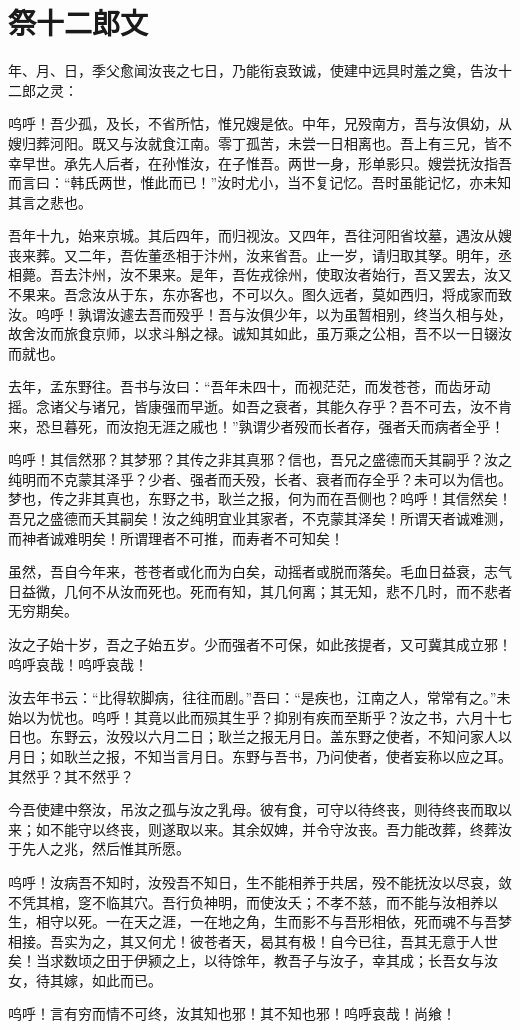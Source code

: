 \section{ 祭十二郎文}

年、月、日，季父愈闻汝丧之七日，乃能衔哀致诚，使建中远具时羞之奠，告汝十二郎之灵：

呜呼！吾少孤，及长，不省所怙，惟兄嫂是依。中年，兄殁南方，吾与汝俱幼，从嫂归葬河阳。既又与汝就食江南。零丁孤苦，未尝一日相离也。吾上有三兄，皆不幸早世。承先人后者，在孙惟汝，在子惟吾。两世一身，形单影只。嫂尝抚汝指吾而言曰：“韩氏两世，惟此而已！”汝时尤小，当不复记忆。吾时虽能记忆，亦未知其言之悲也。

吾年十九，始来京城。其后四年，而归视汝。又四年，吾往河阳省坟墓，遇汝从嫂丧来葬。又二年，吾佐董丞相于汴州，汝来省吾。止一岁，请归取其孥。明年，丞相薨。吾去汴州，汝不果来。是年，吾佐戎徐州，使取汝者始行，吾又罢去，汝又不果来。吾念汝从于东，东亦客也，不可以久。图久远者，莫如西归，将成家而致汝。呜呼！孰谓汝遽去吾而殁乎！吾与汝俱少年，以为虽暂相别，终当久相与处，故舍汝而旅食京师，以求斗斛之禄。诚知其如此，虽万乘之公相，吾不以一日辍汝而就也。

去年，孟东野往。吾书与汝曰：“吾年未四十，而视茫茫，而发苍苍，而齿牙动摇。念诸父与诸兄，皆康强而早逝。如吾之衰者，其能久存乎？吾不可去，汝不肯来，恐旦暮死，而汝抱无涯之戚也！”孰谓少者殁而长者存，强者夭而病者全乎！

呜呼！其信然邪？其梦邪？其传之非其真邪？信也，吾兄之盛德而夭其嗣乎？汝之纯明而不克蒙其泽乎？少者、强者而夭殁，长者、衰者而存全乎？未可以为信也。梦也，传之非其真也，东野之书，耿兰之报，何为而在吾侧也？呜呼！其信然矣！吾兄之盛德而夭其嗣矣！汝之纯明宜业其家者，不克蒙其泽矣！所谓天者诚难测，而神者诚难明矣！所谓理者不可推，而寿者不可知矣！

虽然，吾自今年来，苍苍者或化而为白矣，动摇者或脱而落矣。毛血日益衰，志气日益微，几何不从汝而死也。死而有知，其几何离；其无知，悲不几时，而不悲者无穷期矣。

汝之子始十岁，吾之子始五岁。少而强者不可保，如此孩提者，又可冀其成立邪！呜呼哀哉！呜呼哀哉！

汝去年书云：“比得软脚病，往往而剧。”吾曰：“是疾也，江南之人，常常有之。”未始以为忧也。呜呼！其竟以此而殒其生乎？抑别有疾而至斯乎？汝之书，六月十七日也。东野云，汝殁以六月二日；耿兰之报无月日。盖东野之使者，不知问家人以月日；如耿兰之报，不知当言月日。东野与吾书，乃问使者，使者妄称以应之耳。其然乎？其不然乎？

今吾使建中祭汝，吊汝之孤与汝之乳母。彼有食，可守以待终丧，则待终丧而取以来；如不能守以终丧，则遂取以来。其余奴婢，并令守汝丧。吾力能改葬，终葬汝于先人之兆，然后惟其所愿。

呜呼！汝病吾不知时，汝殁吾不知日，生不能相养于共居，殁不能抚汝以尽哀，敛不凭其棺，窆不临其穴。吾行负神明，而使汝夭；不孝不慈，而不能与汝相养以生，相守以死。一在天之涯，一在地之角，生而影不与吾形相依，死而魂不与吾梦相接。吾实为之，其又何尤！彼苍者天，曷其有极！自今已往，吾其无意于人世矣！当求数顷之田于伊颍之上，以待馀年，教吾子与汝子，幸其成；长吾女与汝女，待其嫁，如此而已。

呜呼！言有穷而情不可终，汝其知也邪！其不知也邪！呜呼哀哉！尚飨！